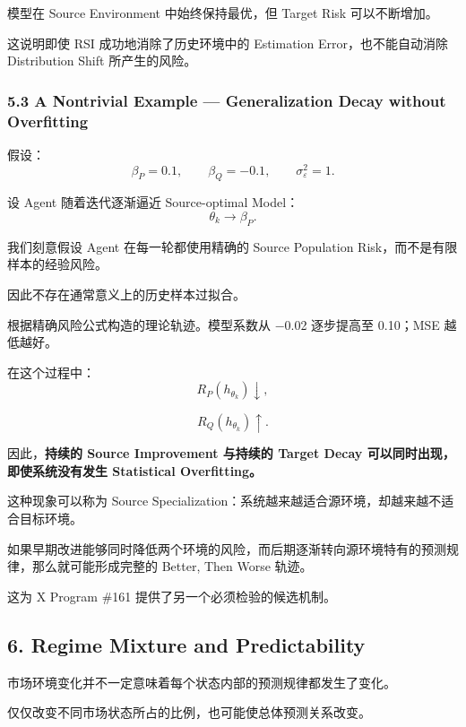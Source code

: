 模型在 Source Environment 中始终保持最优，但 Target Risk 可以不断增加。

这说明即使 RSI 成功地消除了历史环境中的 Estimation Error，也不能自动消除 Distribution Shift 所产生的风险。

\hypertarget{part-4-77-0001-a-nontrivial-example-generalization-decay-without-overfitting}{%
\subsubsection{5.3 A Nontrivial Example --- Generalization Decay without Overfitting}\label{part-4-77-0001-a-nontrivial-example-generalization-decay-without-overfitting}}

假设：
\[\beta_P=0.1,
\qquad
\beta_Q=-0.1,
\qquad
\sigma_\varepsilon^2=1.\]

设 Agent 随着迭代逐渐逼近 Source-optimal Model：
\[\theta_k\longrightarrow\beta_P.\]

我们刻意假设 Agent 在每一轮都使用精确的 Source Population Risk，而不是有限样本的经验风险。

因此不存在通常意义上的历史样本过拟合。


根据精确风险公式构造的理论轨迹。模型系数从 −0.02 逐步提高至 0.10；MSE 越低越好。

在这个过程中：
\[R_P(h_{\theta_k})\downarrow,\]

\[R_Q(h_{\theta_k})\uparrow.\]

因此，\textbf{持续的 Source Improvement 与持续的 Target Decay 可以同时出现，即使系统没有发生 Statistical Overfitting。}

这种现象可以称为 Source Specialization：系统越来越适合源环境，却越来越不适合目标环境。

如果早期改进能够同时降低两个环境的风险，而后期逐渐转向源环境特有的预测规律，那么就可能形成完整的 Better, Then Worse 轨迹。

这为 X Program \#161 提供了另一个必须检验的候选机制。

\hypertarget{part-4-77-0001-regime-mixture-and-predictability}{%
\subsection{6. Regime Mixture and Predictability}\label{part-4-77-0001-regime-mixture-and-predictability}}

市场环境变化并不一定意味着每个状态内部的预测规律都发生了变化。

仅仅改变不同市场状态所占的比例，也可能使总体预测关系改变。

